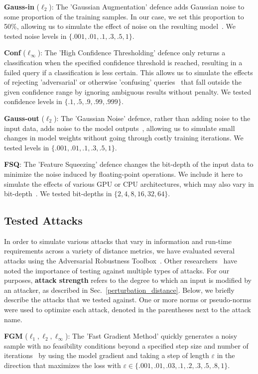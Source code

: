 \textbf{Gauss-in} ($\ell_2$): The 'Gaussian Augmentation' defence adds Gaussian noise to some proportion of the training samples. In our case, we set this proportion to 50\%, allowing us to simulate the effect of noise on the resulting model~\citep{gauss_aug}. We tested noise levels in $\{.001, .01, .1, .3, .5, 1\}$.

\textbf{Conf} ($\ell_{\infty}$): The 'High Confidence Thresholding' defence only returns a classification when the specified confidence threshold is reached, resulting in a failed query if a classification is less certain. This allows us to simulate the effects of rejecting 'adversarial' or otherwise 'confusing' queries~\citep{high_conf} that fall outside the given confidence range by ignoring ambiguous results without penalty. We tested confidence levels in $\{.1, .5, .9, .99, .999\}$.

\textbf{Gauss-out} ($\ell_2$): The 'Gaussian Noise' defence, rather than adding noise to the input data, adds noise to the model outputs~\citep{gauss_out}, allowing us to simulate small changes in model weights without going through costly training iterations. We tested levels in $\{.001, .01, .1, .3, .5, 1\}$.

\textbf{FSQ}: The 'Feature Squeezing' defence changes the bit-depth of the input data to minimize the noise induced by floating-point operations. We include it here to simulate the effects of various GPU or CPU architectures, which may also vary in bit-depth~\citep{feature_squeezing}. We tested bit-depths in $\{2, 4, 8, 16, 32, 64\}$.


\subsection{Tested Attacks}
\label{attacks}

In order to simulate various attacks that vary in information and run-time requirements across a variety of distance metrics, we have evaluated several attacks using the Adversarial Robustness Toolbox~\citep{art2018}. Other researchers~\citep{carlini_towards_2017} have noted the importance of testing against multiple types of attacks. For our purposes, \textbf{attack strength} refers to the degree to which an input is modified by an attacker, as described in Sec.~\ref{perturbation_distance}. Below, we briefly describe the attacks that we tested against. One or more norms or pseudo-norms were used to optimize each attack, denoted in the parentheses next to the attack name.

\textbf{FGM} ($\ell_1, \ell_2, \ell_{\infty}$): The 'Fast Gradient Method' quickly generates a noisy sample with no feasibility conditions beyond a specified step size and number of iterations~\citep{fgm} by using the model gradient and taking a step of length $\varepsilon$ in the direction that maximizes the loss with $\varepsilon \in \{.001,.01,.03,.1,.2,.3,.5,.8,1\}$.

